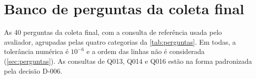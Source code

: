 
\chapter{Banco de perguntas da coleta final}
\label{ap:perguntas}

As 40 perguntas da coleta final, com a consulta de referência usada pelo
avaliador, agrupadas pelas quatro categorias da \autoref{tab:perguntas}.
Em todas, a tolerância numérica é $10^{-6}$ e a ordem das linhas não é
considerada (\autoref{sec:perguntas}). As consultas de Q013, Q014 e Q016
estão na forma padronizada pela decisão D-006.

